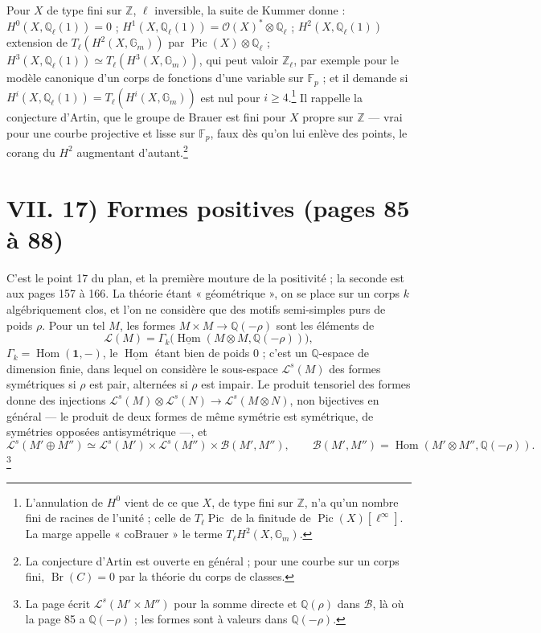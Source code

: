 \documentclass[11pt,a4paper]{article}
\begin{document}
Pour $X$ de type fini sur $\mathbb{Z}$, $\ell$ inversible, la suite de Kummer
donne : $H^{0}(X, \mathbb{Q}_{\ell}(1)) = 0$ ; $H^{1}(X, \mathbb{Q}_{\ell}(1)) =
\mathcal{O}(X)^{*} \otimes \mathbb{Q}_{\ell}$ ; $H^{2}(X, \mathbb{Q}_{\ell}(1))$
extension de $T_{\ell}(H^{2}(X, \mathbb{G}_{m}))$ par $\operatorname{Pic}(X) \otimes
\mathbb{Q}_{\ell}$ ; $H^{3}(X, \mathbb{Q}_{\ell}(1)) \simeq T_{\ell}(H^{3}(X,
\mathbb{G}_{m}))$, qui peut valoir $\mathbb{Z}_{\ell}$, par exemple pour le modèle
canonique d'un corps de fonctions d'une variable sur $\mathbb{F}_{p}$ ; et il demande si
$H^{i}(X, \mathbb{Q}_{\ell}(1)) = T_{\ell}(H^{i}(X, \mathbb{G}_{m}))$ est nul pour
$i \geqslant 4$.\footnote{L'annulation de $H^{0}$ vient de ce que $X$, de type fini
sur $\mathbb{Z}$, n'a qu'un nombre fini de racines de l'unité ; celle de
$T_{\ell}\operatorname{Pic}$ de la finitude de $\operatorname{Pic}(X)[\ell^{\infty}]$.
La marge appelle « coBrauer » le terme $T_{\ell}H^{2}(X, \mathbb{G}_{m})$.} Il
rappelle la conjecture d'Artin, que le groupe de Brauer est fini pour $X$ propre
sur $\mathbb{Z}$ --- vrai pour une courbe projective et lisse sur $\mathbb{F}_{p}$,
faux dès qu'on lui enlève des points, le corang du $H^{2}$ augmentant
d'autant.\footnote{La conjecture d'Artin est ouverte en général ; pour une courbe
sur un corps fini, $\operatorname{Br}(C) = 0$ par la théorie du corps de classes.}

\section*{VII. 17) Formes positives (pages 85 à 88)}

C'est le point 17 du plan, et la première mouture de la positivité ; la seconde
est aux pages 157 à 166. La théorie étant « géométrique », on se place sur un
corps $k$ algébriquement clos, et l'on ne considère que des motifs semi-simples
purs de poids $\rho$. Pour un tel $M$, les formes $M \times M \to \mathbb{Q}(-\rho)$
sont les éléments de
\[
\mathcal{L}(M) = \Gamma_{k}\bigl(\underline{\operatorname{Hom}}(M \otimes M,
\mathbb{Q}(-\rho))\bigr) ,
\]
$\Gamma_{k} = \operatorname{Hom}(\mathbf{1}, -)$, le $\underline{\operatorname{Hom}}$
étant bien de poids $0$ ; c'est un $\mathbb{Q}$-espace de dimension finie, dans
lequel on considère le sous-espace $\mathcal{L}^{s}(M)$ des formes symétriques si
$\rho$ est pair, alternées si $\rho$ est impair. Le produit tensoriel des formes donne
des injections $\mathcal{L}^{s}(M) \otimes \mathcal{L}^{s}(N) \to \mathcal{L}^{s}(M
\otimes N)$, non bijectives en général --- le produit de deux formes de même
symétrie est symétrique, de symétries opposées antisymétrique ---, et
\[
\mathcal{L}^{s}(M' \oplus M'') \simeq \mathcal{L}^{s}(M') \times \mathcal{L}^{s}(M'')
\times \mathcal{B}(M', M'') ,
\qquad
\mathcal{B}(M', M'') = \operatorname{Hom}(M' \otimes M'', \mathbb{Q}(-\rho)) .
\]\footnote{La page écrit $\mathcal{L}^{s}(M' \times M'')$ pour la somme directe et
$\mathbb{Q}(\rho)$ dans $\mathcal{B}$, là où la page 85 a $\mathbb{Q}(-\rho)$ ; les
formes sont à valeurs dans $\mathbb{Q}(-\rho)$.}
\end{document}
